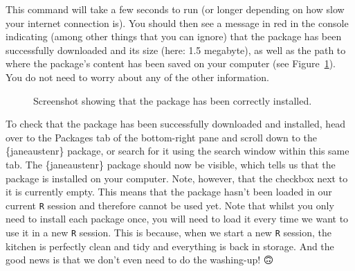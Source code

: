 \documentclass[
  letterpaper,
  DIV=11,
  numbers=noendperiod,
  oneside]{scrreprt}
\begin{document}
This command will take a few seconds to run (or longer depending on how
slow your internet connection is). You should then see a message in red
in the console indicating (among other things that you can ignore) that
the package has been successfully downloaded and its size (here: 1.5
megabyte), as well as the path to where the package's content has been
saved on your computer (see Figure~\ref{fig-PckInstalled}). You do not
need to worry about any of the other information.

\begin{figure}


\caption{\label{fig-PckInstalled}Screenshot showing that the package has
been correctly installed.}

\end{figure}%

To check that the package has been successfully downloaded and
installed, head over to the Packages tab of the bottom-right pane and
scroll down to the \{janeaustenr\} package, or search for it using the
search window within this same tab. The \{janeaustenr\} package should
now be visible, which tells us that the package is installed on your
computer. Note, however, that the checkbox next to it is currently
empty. This means that the package hasn't been loaded in our current
\texttt{R} session and therefore cannot be used yet. Note that whilst
you only need to install each package once, you will need to load it
every time we want to use it in a new \texttt{R} session. This is
because, when we start a new \texttt{R} session, the kitchen is
perfectly clean and tidy and everything is back in storage. And the good
news is that we don't even need to do the washing-up! 🙃
\end{document}
